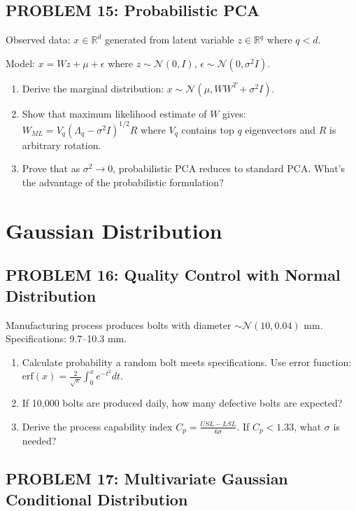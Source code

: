 \documentclass[12pt]{article}
\begin{document}
\subsection*{PROBLEM 15: Probabilistic PCA}

Observed data: \(x \in \mathbb{R}^d\) generated from latent variable \(z \in \mathbb{R}^q\) where \(q < d\).

Model: \(x = Wz + \mu + \epsilon\) where \(z \sim \mathcal{N}(0, I)\), \(\epsilon \sim \mathcal{N}(0, \sigma^2I)\).

\begin{enumerate}
\item[(a)] Derive the marginal distribution: \(x \sim \mathcal{N}(\mu, WW^T + \sigma^2I)\).
\item[(b)] Show that maximum likelihood estimate of \(W\) gives: \(W_{ML} = V_q(\Lambda_q - \sigma^2I)^{1/2}R\) where \(V_q\) contains top \(q\) eigenvectors and \(R\) is arbitrary rotation.
\item[(c)] Prove that as \(\sigma^2 \to 0\), probabilistic PCA reduces to standard PCA. What's the advantage of the probabilistic formulation?
\end{enumerate}

\newpage
\section*{Gaussian Distribution}

\subsection*{PROBLEM 16: Quality Control with Normal Distribution}

Manufacturing process produces bolts with diameter \(\sim \mathcal{N}(10, 0.04)\) mm. Specifications: 9.7–10.3 mm.

\begin{enumerate}
\item[(a)] Calculate probability a random bolt meets specifications. Use error function: \(\text{erf}(x) = \frac{2}{\sqrt{\pi}}\int_0^x e^{-t^2}dt\).
\item[(b)] If 10,000 bolts are produced daily, how many defective bolts are expected?
\item[(c)] Derive the process capability index \(C_p = \frac{USL - LSL}{6\sigma}\). If \(C_p < 1.33\), what \(\sigma\) is needed?
\end{enumerate}

\subsection*{PROBLEM 17: Multivariate Gaussian Conditional Distribution}
\end{document}
